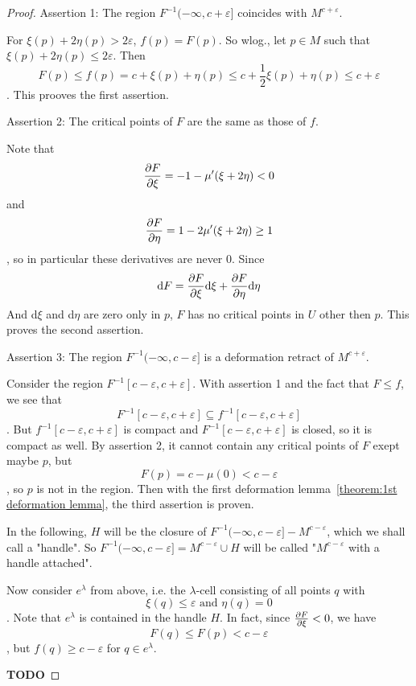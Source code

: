 \begin{proof}
    Assertion 1: The region $F^{-1}(-\infty, c + \varepsilon]$ coincides with 
    $M^{c + \varepsilon}$.
 
    For $\xi(p) + 2 \eta(p) > 2 \varepsilon$, $f(p) = F(p)$. So wlog., 
    let $p \in M$ such that $\xi(p) + 2 \eta(p) \leq 2 \varepsilon$. Then 
    \[ F(p) \leq f(p) = c + \xi(p) + \eta(p) 
    \leq c + \frac{1}{2} \xi(p) + \eta(p) 
    \leq c + \varepsilon \]. 
    This prooves the first assertion.
 
    Assertion 2: The critical points of $F$ are the same as those of $f$.
 
    Note that 
    \[ \pderive[F]{\xi} = -1 - \mu'(\xi + 2 \eta) < 0\]
    and
    \[ \pderive[F]{\eta} = 1 - 2 \mu'(\xi + 2 \eta) \geq 1 \]
    , so in particular these derivatives are never $0$. Since 
    \[ \text{d}F = \pderive[F]{\xi}\text{d}\xi + \pderive[F]{\eta} \text{d}\eta \]
    And d$\xi$ and d$\eta$ are zero only in $p$, $F$ has no critical points
    in $U$ other then $p$. This proves the second assertion.
 
    Assertion 3: The region $F^{-1}(-\infty, c - \varepsilon]$ is a deformation 
    retract of $M^{c + \varepsilon}$.
 
    Consider the region $F^{-1}[c - \varepsilon, c + \varepsilon]$. With 
    assertion 1 and the fact that $F \leq f$, we see that
    \[ F^{-1}[c - \varepsilon, c + \varepsilon] \subseteq f^{-1}[c - \varepsilon, c + \varepsilon] \] .
    But $f^{-1}[c - \varepsilon, c + \varepsilon]$ is compact and 
    $F^{-1}[c - \varepsilon, c + \varepsilon]$ is closed, so it is compact as 
    well. By assertion 2, it cannot contain any critical points of $F$ exept 
    maybe $p$, but
    \[ F(p) = c - \mu(0) < c - \varepsilon \],
    so $p$ is not in the region. Then with the first deformation 
    lemma~\ref{theorem:1st deformation lemma}, the third assertion is proven.
    
    In the following, $H$ will be the closure of 
    $F^{-1}(- \infty, c - \varepsilon] - M^{c - \varepsilon}$, which we shall call
    a "handle". So $F^{-1}(- \infty, c - \varepsilon] = M^{c - \varepsilon} \cup H$
    will be called "$M^{c - \varepsilon}$ with a handle attached".

    Now consider $e^{\lambda}$ from above, i.e. the $\lambda$-cell consisting of
    all points $q$ with
    \[ \xi(q) \leq \varepsilon \text{ and } \eta(q) = 0 \].
    Note that $e^{\lambda}$ is contained in the handle $H$. In fact, since 
    $\pderive[F]{\xi} < 0$, we have
    \[ F(q) \leq F(p) < c - \varepsilon \],
    but $f(q) \geq c - \varepsilon$ for $q \in e^{\lambda}$.
    
    \textbf{TODO}
 \end{proof}